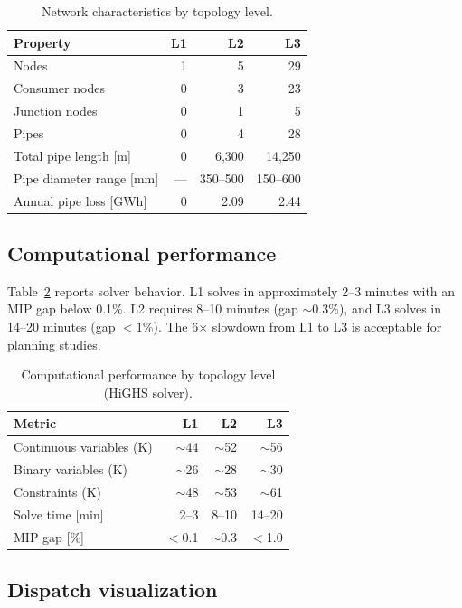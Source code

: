 \documentclass[a4paper,fleqn]{cas-dc}
\begin{document}
\begin{table}[t]
\centering
\caption{Network characteristics by topology level.}\label{tab:network}
\begin{tabular*}{\tblwidth}{@{}lrrr@{}}
\toprule
Property & \textbf{L1} & \textbf{L2} & \textbf{L3} \\
\midrule
Nodes & 1 & 5 & 29 \\
Consumer nodes & 0 & 3 & 23 \\
Junction nodes & 0 & 1 & 5 \\
Pipes & 0 & 4 & 28 \\
Total pipe length [m] & 0 & 6,300 & 14,250 \\
Pipe diameter range [mm] & --- & 350--500 & 150--600 \\
Annual pipe loss [GWh] & 0 & 2.09 & 2.44 \\
\bottomrule
\end{tabular*}
\end{table}

\subsection{Computational performance}

Table~\ref{tab:solver} reports solver behavior. L1 solves in approximately 2--3 minutes with an MIP gap below 0.1\%. L2 requires 8--10 minutes (gap $\sim$0.3\%), and L3 solves in 14--20 minutes (gap $<$1\%). The 6$\times$ slowdown from L1 to L3 is acceptable for planning studies.

\begin{table}[t]
\centering
\caption{Computational performance by topology level (HiGHS solver).}\label{tab:solver}
\begin{tabular*}{\tblwidth}{@{}lrrr@{}}
\toprule
Metric & \textbf{L1} & \textbf{L2} & \textbf{L3} \\
\midrule
Continuous variables (K) & $\sim$44 & $\sim$52 & $\sim$56 \\
Binary variables (K) & $\sim$26 & $\sim$28 & $\sim$30 \\
Constraints (K) & $\sim$48 & $\sim$53 & $\sim$61 \\
Solve time [min] & 2--3 & 8--10 & 14--20 \\
MIP gap [\%] & $<$0.1 & $\sim$0.3 & $<$1.0 \\
\bottomrule
\end{tabular*}
\end{table}

\subsection{Dispatch visualization}
\end{document}
